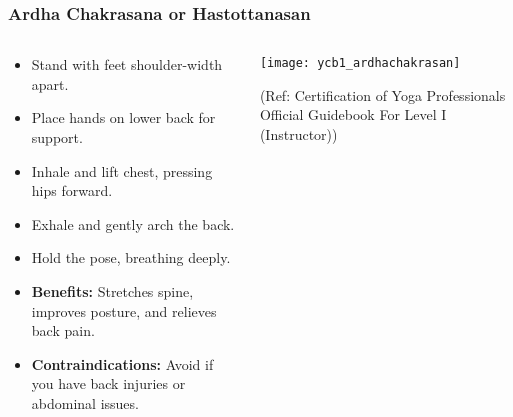 \begin{frame}[fragile]\frametitle{Ardha Chakrasana or Hastottanasan}
\begin{columns}
    \begin{column}[T]{0.5\linewidth}
      \begin{itemize}
        \item Stand with feet shoulder-width apart.
        \item Place hands on lower back for support.
        \item Inhale and lift chest, pressing hips forward.
        \item Exhale and gently arch the back.
        \item Hold the pose, breathing deeply.
        \item \textbf{Benefits:} Stretches spine, improves posture, and relieves back pain.
        \item \textbf{Contraindications:} Avoid if you have back injuries or abdominal issues.
      \end{itemize}
    \end{column}
    \begin{column}[T]{0.5\linewidth}
        \begin{center}
        \begin{center}
		        \texttt{[image: ycb1\_ardhachakrasan]}
				
				{\tiny (Ref: Certification  of Yoga Professionals Official Guidebook For Level I (Instructor))}	        
		\end{center}   
        \end{center}    
    \end{column}
  \end{columns}
\end{frame}

